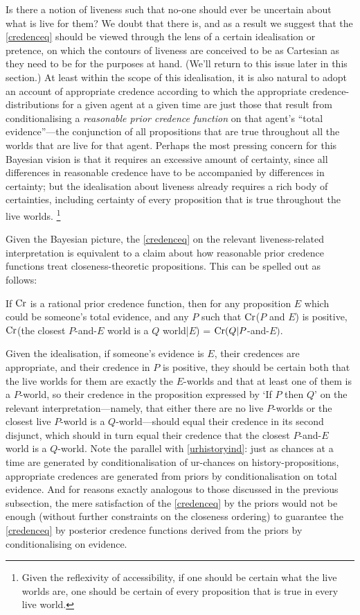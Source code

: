 \documentclass[If.tex]{subfiles}
\begin{document}
Is there a notion of liveness such that no-one should ever be uncertain about what is live for them?  We doubt that there is, and as a result we suggest that the \ref{credenceq} should be viewed through the lens of a certain idealisation or pretence, on which the contours of liveness are conceived to be as Cartesian as they need to be for the purposes at hand.  (We'll return to this issue later in this section.)  At least within the scope of this idealisation, it is also natural to adopt an account of appropriate credence according to which the appropriate credence-distributions for a given agent at a given time are just those that result from conditionalising a \emph{reasonable prior credence function} on that agent's “total evidence”---the conjunction of all propositions that are true throughout all the worlds that are live for that agent.  Perhaps the most pressing concern for this Bayesian vision is that it requires an excessive amount of certainty, since all differences in reasonable credence have to be accompanied by differences in certainty; but the idealisation about liveness already requires a rich body of certainties, including certainty of every proposition that is true throughout the live worlds.%
\footnote{Given the reflexivity of accessibility, if one should be certain what the live worlds are, one should be certain of every proposition that is true in every live world.}    

Given the Bayesian picture, the \ref{credenceq} on the relevant liveness-related interpretation is equivalent to a claim about how reasonable prior credence functions treat closeness-theoretic propositions.  This can be spelled out as follows:
\begin{prop}
	\litem[Prior-Ev] \label{prioreq}
	If $\operatorname{Cr}$ is a rational prior credence function, then for any proposition $E$ which could be someone's total evidence, and any $P$ such that $\operatorname{Cr}$($P$ and $E$) is positive, $\operatorname{Cr}$(the closest $P$-and-$E$ world is a $Q$ world|$E$) = $\operatorname{Cr}(Q|P$-and-$E)$. 
\end{prop}
Given the idealisation, if someone's evidence is $E$, their credences are appropriate, and their credence in $P$ is positive, they should be certain both that the live worlds for them are exactly the $E$-worlds and that at least one of them is a $P$-world, so their credence in the proposition expressed by ‘If $P$ then $Q$’ on the relevant interpretation---namely, that either there are no live $P$-worlds or the closest live $P$-world is a $Q$-world---should equal their credence in its second disjunct, which should in turn equal their credence that the closest $P$-and-$E$ world is a $Q$-world.  Note the parallel with \ref{urhistoryind}: just as chances at a time are generated by conditionalisation of ur-chances on history-propositions, appropriate credences are generated from priors by conditionalisation on total evidence.  And for reasons exactly analogous to those discussed in the previous subsection, the mere satisfaction of the \ref{credenceq} by the priors would not be enough (without further constraints on the closeness ordering) to guarantee the \ref{credenceq} by posterior credence functions derived from the priors by conditionalising on evidence.
\end{document}
